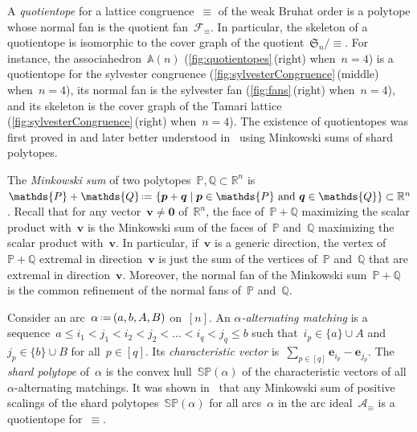 \documentclass{amsart}
\theoremstyle{definition}
\newcommand{\R}{\mathbb{R}} %
\renewcommand{\c}[1]{\mathcal{#1}} %
\renewcommand{\b}[1]{{\boldsymbol{#1}}} %
\newcommand{\f}[1]{\mathfrak{#1}} %
\newcommand{\set}[2]{\left\{ #1 \;\middle|\; #2 \right\}} %
\newcommand{\eqdef}{\mbox{\,\raisebox{0.2ex}{\scriptsize\ensuremath{\mathrm:}}\ensuremath{=}\,}} %
\newcommand{\darkblue}{\color{darkblue}} %
\newcommand{\defn}[1]{\textsl{\darkblue #1}} %
\newcommand{\polytope}[1]{\mathds{#1}} %
\newcommand{\Asso}{\polytope{A}} %
\newcommand{\SP}{\polytope{SP}}
\begin{document}
A \defn{quotientope} for a lattice congruence~$\equiv$ of the weak Bruhat order is a polytope whose normal fan is the quotient fan~$\c{F}_\equiv$.
In particular, the skeleton of a quotientope is isomorphic to the cover graph of the quotient~$\f{S}_n/{\equiv}$.
For instance, the associahedron~$\Asso(n)$ (\cref{fig:quotientopes}\,(right) when~$n = 4$)  is a quotientope for the sylvester congruence (\cref{fig:sylvesterCongruence}\,(middle) when~$n = 4$), its normal fan is the sylvester fan (\cref{fig:fans}\,(right) when~$n = 4$), and its skeleton is the cover graph of the Tamari lattice (\cref{fig:sylvesterCongruence}\,(right) when~$n = 4$).
The existence of quotientopes was first proved in \cite{MR3964495} and later better understood in~\cite{MR4584712} using Minkowski sums of shard polytopes.

The \defn{Minkowski sum} of two polytopes~$\polytope{P}, \polytope{Q} \subset \R^n$ is~$\polytope{P} + \polytope{Q} \eqdef \set{\b{p} + \b{q}}{\b{p} \in \polytope{P} \text{ and } \b{q} \in \polytope{Q}} \subset \R^n$.
Recall that for any vector~$\b{v} \ne \b{0}$ of~$\R^n$, the face of~$\polytope{P} + \polytope{Q}$ maximizing the scalar product with~$\b{v}$ is the Minkowski sum of the faces of~$\polytope{P}$ and~$\polytope{Q}$ maximizing the scalar product with~$\b{v}$.
In particular, if~$\b{v}$ is a generic direction, the vertex of~$\polytope{P} + \polytope{Q}$ extremal in direction~$\b{v}$ is just the sum of the vertices of~$\polytope{P}$ and~$\polytope{Q}$ that are extremal in direction~$\b{v}$.
Moreover, the normal fan of the Minkowski sum~$\polytope{P} + \polytope{Q}$ is the common refinement of the normal fans of~$\polytope{P}$ and~$\polytope{Q}$.

Consider an arc~$\alpha \eqdef (a, b, A, B)$ on~$[n]$.
An \defn{$\alpha$-alternating matching} is a sequence~$a \le i_1 < j_1 < i_2 < j_2 < \dots < i_q < j_q \le b$ such that~$i_p \in \{a\} \cup A$ and~$j_p \in \{b\} \cup B$ for all~$p \in [q]$.
Its \defn{characteristic vector} is~$\sum_{p \in [q]} \b{e}_{i_p} - \b{e}_{j_p}$.
The \defn{shard polytope} of~$\alpha$ is the convex hull~$\SP(\alpha)$ of the characteristic vectors of all $\alpha$-alternating matchings.
It was shown in~\cite{MR4584712} that any Minkowski sum of positive scalings of the shard polytopes~$\SP(\alpha)$ for all arcs~$\alpha$ in the arc ideal~$\c{A}_\equiv$ is a quotientope for~$\equiv$.
\end{document}
